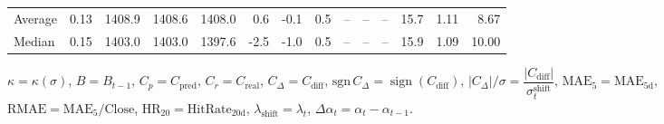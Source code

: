 \begin{threeparttable}
{\begin{tabular}{lrrrrrrrrrrrrr}
Average &     0.13 & 1408.9 & 1408.6 & 1408.0 &        0.6 &                     -0.1 &                 0.5 &         -- &        -- &             -- &             15.7 &            1.11 &                   8.67 \\
 Median &     0.15 & 1403.0 & 1403.0 & 1397.6 &       -2.5 &                     -1.0 &                 0.5 &         -- &        -- &             -- &             15.9 &            1.09 &                  10.00 \\
\bottomrule
\end{tabular}
}
\begin{tablenotes}\footnotesize
\item $\kappa=\kappa(\sigma)$, $B=B_{t-1}$, $C_p=C_{\text{pred}}$, $C_r=C_{\text{real}}$, $C_\Delta=C_{\text{diff}}$, $\mathrm{sgn}\,C_\Delta=\operatorname{sign}(C_{\text{diff}})$, $|C_\Delta|/\sigma=\dfrac{|C_{\text{diff}}|}{\sigma_t^{\text{shift}}}$, $\mathrm{MAE}_5=\mathrm{MAE}_{5\text{d}}$, $\mathrm{RMAE}= \mathrm{MAE}_5 / \text{Close}$, $\mathrm{HR}_{20}=\mathrm{HitRate}_{20\text{d}}$, 
$\lambda_{\text{shift}}=\lambda_t$, 
$\Delta\alpha_t=\alpha_t-\alpha_{t-1}$.
\end{tablenotes}
\end{threeparttable}
\endgroup
